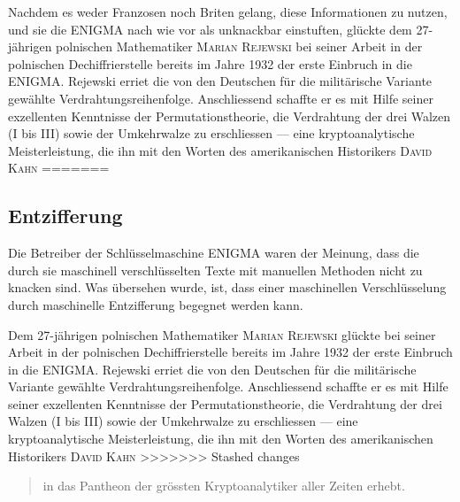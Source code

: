 \documentclass[%
<<<<<<< Updated upstream
11pt,%
twoside,%
titlepage,%
german,%
headsepline%
]{scrartcl}
\begin{document}
Nachdem es weder Franzosen noch Briten gelang, diese Informationen zu nutzen, und sie die ENIGMA nach wie vor als unknackbar einstuften, glückte dem 27-jährigen polnischen Mathematiker \textsc{Marian Rejewski} bei seiner Arbeit in der polnischen Dechiffrierstelle bereits im Jahre 1932 der erste Einbruch in die ENIGMA. Rejewski erriet die von den Deutschen für die militärische Variante gewählte Verdrahtungsreihenfolge. Anschliessend schaffte er es mit Hilfe seiner exzellenten Kenntnisse der Permutationstheorie, die Verdrahtung der drei Walzen (I bis III) sowie der Umkehrwalze zu erschliessen --- eine kryptoanalytische Meisterleistung, die ihn mit den Worten des amerikanischen Historikers \textsc{David Kahn}
=======
\subsection{Entzifferung}

Die Betreiber der Schlüsselmaschine ENIGMA waren der Meinung, dass die durch sie maschinell verschlüsselten Texte mit manuellen Methoden nicht zu knacken sind. Was übersehen wurde, ist, dass einer maschinellen Verschlüsselung durch maschinelle Entzifferung begegnet werden kann.

Dem 27-jährigen polnischen Mathematiker \textsc{Marian Rejewski} glückte bei seiner Arbeit in der polnischen Dechiffrierstelle bereits im Jahre 1932 der erste Einbruch in die ENIGMA. Rejewski erriet die von den Deutschen für die militärische Variante gewählte Verdrahtungsreihenfolge. Anschliessend schaffte er es mit Hilfe seiner exzellenten Kenntnisse der Permutationstheorie, die Verdrahtung der drei Walzen (I bis III) sowie der Umkehrwalze zu erschliessen --- eine kryptoanalytische Meisterleistung, die ihn mit den Worten des amerikanischen Historikers \textsc{David Kahn}
>>>>>>> Stashed changes

\begin{quote}
in das Pantheon der grössten Kryptoanalytiker aller Zeiten erhebt.
\end{quote}
\end{document}
